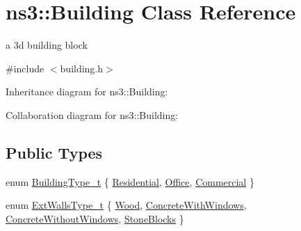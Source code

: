 \hypertarget{classns3_1_1Building}{}\section{ns3\+:\+:Building Class Reference}
\label{classns3_1_1Building}


a 3d building block  




{\ttfamily \#include $<$building.\+h$>$}



Inheritance diagram for ns3\+:\+:Building\+:


Collaboration diagram for ns3\+:\+:Building\+:
\subsection*{Public Types}
\begin{DoxyCompactItemize}
\item 
enum \hyperlink{classns3_1_1Building_af7f3940d00690b70af02310575d94ef3}{Building\+Type\+\_\+t} \{ \hyperlink{classns3_1_1Building_af7f3940d00690b70af02310575d94ef3a5af50bb22db7202f426f0e7621bafc7b}{Residential}, 
\hyperlink{classns3_1_1Building_af7f3940d00690b70af02310575d94ef3acbb89a32dbb85f1eb6ac70baf61a0735}{Office}, 
\hyperlink{classns3_1_1Building_af7f3940d00690b70af02310575d94ef3aa2daecca877283b8bb46a201393dcd01}{Commercial}
 \}
\item 
enum \hyperlink{classns3_1_1Building_a298adc08038580830c70d4cac8fcfefe}{Ext\+Walls\+Type\+\_\+t} \{ \hyperlink{classns3_1_1Building_a298adc08038580830c70d4cac8fcfefea072008eac9e24ff8f088c105572ebffe}{Wood}, 
\hyperlink{classns3_1_1Building_a298adc08038580830c70d4cac8fcfefeae4c01a615e1a1a32bef9a09070689369}{Concrete\+With\+Windows}, 
\hyperlink{classns3_1_1Building_a298adc08038580830c70d4cac8fcfefeae92c37f02cd4d7fb29b330b6bde073c5}{Concrete\+Without\+Windows}, 
\hyperlink{classns3_1_1Building_a298adc08038580830c70d4cac8fcfefeabe06cde1c1af3f87dda18e6087796168}{Stone\+Blocks}
 \}
\end{DoxyCompactItemize}
